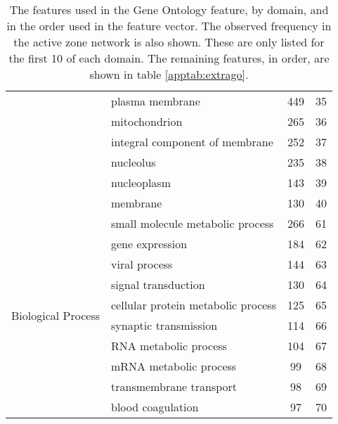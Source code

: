 \begin{table}
\begin{tabular}{l p{} c c}
                                              & plasma membrane & 449 & 35 \\
                                              & mitochondrion & 265 & 36 \\
                                              & integral component of membrane & 252 & 37 \\
                                              & nucleolus & 235 & 38 \\
                                              & nucleoplasm & 143 & 39 \\
                                              & membrane & 130 & 40 \\
        \hline
        \multirow{10}{*}{Biological Process}  & small molecule metabolic process & 266 & 61 \\
                                              & gene expression & 184 & 62 \\
                                              & viral process & 144 & 63 \\
                                              & signal transduction & 130 & 64 \\
                                              & cellular protein metabolic process & 125 & 65 \\
                                              & synaptic transmission & 114 & 66 \\
                                              & RNA metabolic process & 104 & 67 \\
                                              & mRNA metabolic process & 99 & 68 \\
                                              & transmembrane transport & 98 & 69 \\
                                              & blood coagulation & 97 & 70 \\
    \end{tabular}
    \caption{The features used in the Gene Ontology feature, by domain, and in the order used in the feature vector. The observed frequency in the active zone network is also shown. These are only listed for the first 10 of each domain. The remaining features, in order, are shown in table \ref{apptab:extrago}.}
    \label{apptab:go}
\end{table}


